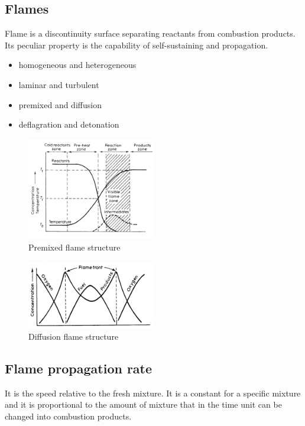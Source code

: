 \documentclass[12pt]{article}
\begin{document}
\subsection{Flames}

Flame is a discontinuity surface separating reactants from combustion products. Its peculiar property is the capability of self-sustaining and propagation.

\begin{itemize}
    \item homogeneous and heterogeneous
    \item laminar and turbulent
    \item premixed and diffusion
    \item deflagration and detonation
\end{itemize}

\begin{figure}[!ht]
\centering
\includegraphics[width=0.5\textwidth]{figures/premixed_structure.png}
\caption{Premixed flame structure}
\end{figure}

\begin{figure}[!ht]
\centering
\includegraphics[width=0.5\textwidth]{figures/diffusion_structure.png}
\caption{Diffusion flame structure}
\end{figure}

\subsection{Flame propagation rate}

It is the speed relative to the fresh mixture. It is a constant for a specific mixture and it is proportional to the amount of mixture that in the time unit can be changed into combustion products.
\end{document}
